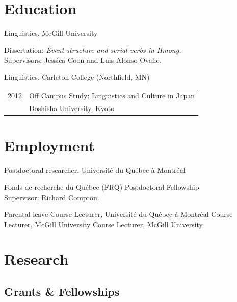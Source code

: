 \documentclass[11pt,oneside,letterpaper]{johnstoncv}
\begin{document}
\begin{entries}

\section{Education}
\Item[Ph.D, 2024]Linguistics, McGill University\smallskip\par%
	{\footnotesize Dissertation: \textit{Event structure and serial verbs in Hmong.} \\ Supervisors: Jessica Coon and Luis Alonso-Ovalle.\par}
\Item[B.A., 2013] Linguistics, Carleton College (Northfield, MN)\smallskip\par%
	{\footnotesize\begin{tabular}{@{}l@{\qquad}l@{}}
	2012 	& Off Campus Study: Linguistics and Culture in Japan\\
		& Doshisha University, Kyoto\\
	\end{tabular}}

\section{Employment}
\Item[2024--Present]
	Postdoctoral researcher, Université du Québec à Montréal\smallskip\par
	{\footnotesize Fonds de recherche du Québec (FRQ) Postdoctoral Fellowship\\Supervisor: Richard Compton.\par}
	
\Item[2025--2026] Parental leave
\Item[2024] Course Lecturer, Université du Québec à Montréal
\Item[2023] Course Lecturer, McGill University
\Item[2021] Course Lecturer, McGill University
	
\section{Research}

\subsection{Grants \& Fellowships}


\end{entries}
\end{document}

